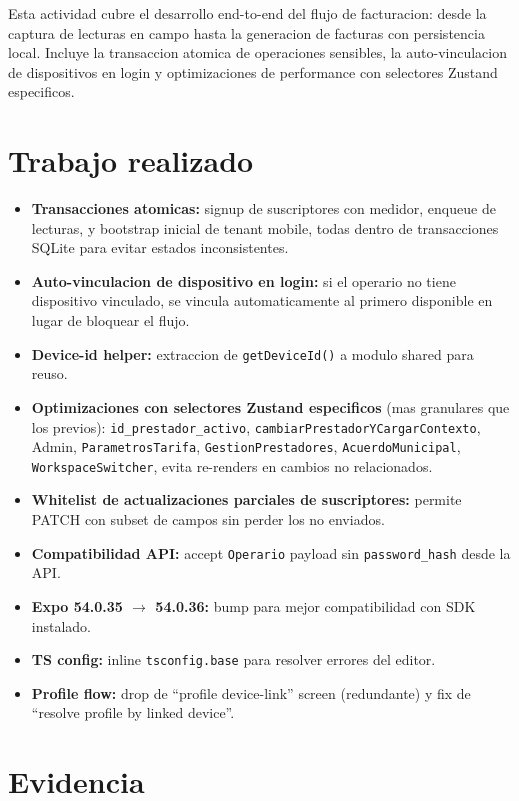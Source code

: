 \documentclass[11pt,a4paper,oneside]{report}
\begin{document}
Esta actividad cubre el desarrollo end-to-end del flujo de facturacion: desde la captura de lecturas en campo hasta la generacion de facturas con persistencia local. Incluye la transaccion atomica de operaciones sensibles, la auto-vinculacion de dispositivos en login y optimizaciones de performance con selectores Zustand especificos.

\section{Trabajo realizado}

\begin{itemize}[leftmargin=*]
    \item \textbf{Transacciones atomicas:} signup de suscriptores con medidor, enqueue de lecturas, y bootstrap inicial de tenant mobile, todas dentro de transacciones SQLite para evitar estados inconsistentes.
    \item \textbf{Auto-vinculacion de dispositivo en login:} si el operario no tiene dispositivo vinculado, se vincula automaticamente al primero disponible en lugar de bloquear el flujo.
    \item \textbf{Device-id helper:} extraccion de \texttt{getDeviceId()} a modulo shared para reuso.
    \item \textbf{Optimizaciones con selectores Zustand especificos} (mas granulares que los previos): \texttt{id\_prestador\_activo}, \texttt{cambiarPrestadorYCargarContexto}, Admin, \texttt{ParametrosTarifa}, \texttt{GestionPrestadores}, \texttt{AcuerdoMunicipal}, \texttt{WorkspaceSwitcher}, evita re-renders en cambios no relacionados.
    \item \textbf{Whitelist de actualizaciones parciales de suscriptores:} permite PATCH con subset de campos sin perder los no enviados.
    \item \textbf{Compatibilidad API:} accept \texttt{Operario} payload sin \texttt{password\_hash} desde la API.
    \item \textbf{Expo 54.0.35 $\to$ 54.0.36:} bump para mejor compatibilidad con SDK instalado.
    \item \textbf{TS config:} inline \texttt{tsconfig.base} para resolver errores del editor.
    \item \textbf{Profile flow:} drop de ``profile device-link'' screen (redundante) y fix de ``resolve profile by linked device''.
\end{itemize}

\section{Evidencia}
\end{document}
